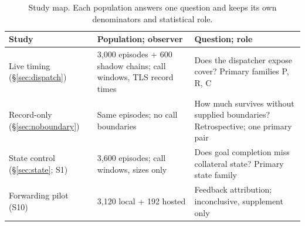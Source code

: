 \begin{table}[t]\centering\footnotesize
\caption{Study map. Each population answers one question and keeps its own denominators and statistical role.}\label{tab:study-map}
\setlength{\tabcolsep}{3pt}
\begin{tabularx}{\columnwidth}{@{}P{.2\columnwidth}P{.25\columnwidth}Y@{}}\toprule
Study & Population; observer & Question; role \\\midrule
Live timing (\S\ref{sec:dispatch}) & 3,000 episodes + 600 shadow chains; call windows, TLS record times & Does the dispatcher expose cover? Primary families P, R, C \\\addlinespace[2pt]
Record-only (\S\ref{sec:noboundary}) & Same episodes; no call boundaries & How much survives without supplied boundaries? Retrospective; one primary pair \\\addlinespace[2pt]
State control (\S\ref{sec:state}; S1) & 3,600 episodes; call windows, sizes only & Does goal completion miss collateral state? Primary state family \\\addlinespace[2pt]
Forwarding pilot (S10) & 3,120 local + 192 hosted & Feedback attribution; inconclusive, supplement only \\\bottomrule
\end{tabularx}\end{table}
